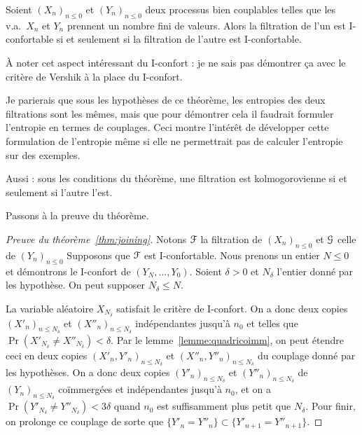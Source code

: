 \documentclass[12pt,a4paper]{article}
\begin{document}
\begin{thm}\label{thm:joining}
Soient ${(X_n)}_{n \leq 0}$ et ${(Y_n)}_{n \leq 0}$ deux processus bien couplables 
telles que les v.a.\ $X_n$ et $Y_n$ prennent un nombre fini de valeurs. 
Alors la filtration de l'un est I-confortable si et seulement si 
la filtration de l'autre est I-confortable.
\end{thm} 

À noter cet aspect intéressant du I-confort : 
je ne sais pas démontrer ça avec le critère de Vershik à la place du I-confort. 

Je parierais que sous les hypothèses de ce théorème, les entropies des deux 
filtrations sont les mêmes, mais que pour démontrer cela il faudrait formuler l'entropie en 
termes de couplages. Ceci montre l'intérêt de développer cette formulation 
de l'entropie même si elle ne permettrait pas de calculer l'entropie sur des exemples.

Aussi : sous les conditions du théorème, une filtration est kolmogorovienne si et seulement 
si l'autre l'est. 

Passons à la preuve du théorème.



\begin{proof}[Preuve du théorème~\ref{thm:joining}]
Notons $\EuScript{F}$ la filtration de  ${(X_n)}_{n \leq 0}$ et 
$\EuScript{G}$ celle de ${(Y_n)}_{n \leq 0}$
Supposons que $\EuScript{F}$ est I-confortable.
Nous prenons un entier $N \leq 0$ et démontrons le I-confort de 
$(Y_N, \ldots, Y_0)$.  
Soient $\delta >0$ et $N_\delta$ l'entier donné par les hypothèse. 
On peut supposer $N_\delta \leq N$. 

La variable aléatoire $X_{N_\delta}$ satisfait le critère de I-confort. 
On a donc deux copies ${(X'_n)}_{n \leq N_\delta}$ et ${(X''_n)}_{n \leq N_\delta}$ 
indépendantes jusqu'à $n_0$ et telles que $\Pr(X'_{N_\delta} \neq X''_{N_\delta}) < \delta$. 
Par le lemme~\ref{lemme:quadricoimm}, on peut étendre ceci 
en deux copies  ${(X'_n, Y'_n)}_{n \leq N_\delta}$ et ${(X''_n, Y''_n)}_{n \leq N_\delta}$ 
du couplage donné par les hypothèses. 
On a donc  deux copies ${(Y'_n)}_{n \leq N_\delta}$ et ${(Y''_n)}_{n \leq N_\delta}$ 
de ${(Y_n)}_{n \leq N_\delta}$ coïmmergées et indépendantes jusqu'à $n_0$, 
et on a $\Pr(Y'_{N_\delta} \neq Y''_{N_\delta}) < 3\delta$ 
quand $n_0$ est suffisamment plus petit que $N_\delta$. 
Pour finir, on prolonge ce couplage de sorte que 
$\{Y'_n = Y''_n\} \subset \{Y'_{n+1} = Y''_{n+1}\}$.
\end{proof}
\end{document}
